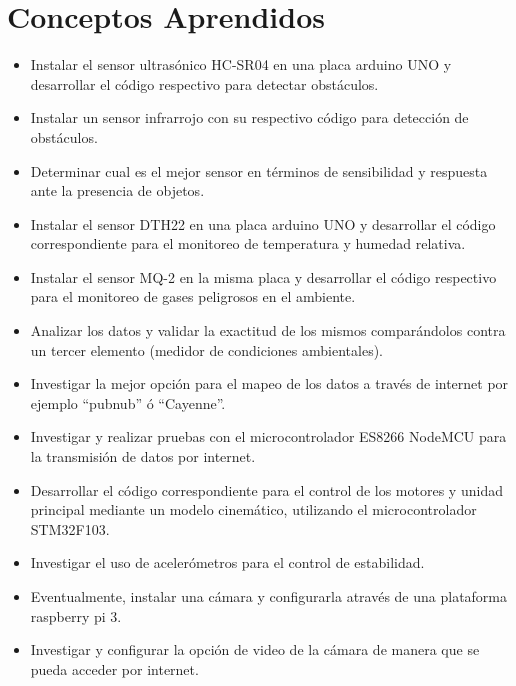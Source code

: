 \documentclass[12pt,letterpaper]{IEEEtran}
\begin{document}
\section{Conceptos Aprendidos}
\begin{itemize}
  \item Instalar el sensor ultrasónico HC-SR04 en una placa arduino UNO y desarrollar el código respectivo para detectar obstáculos.
  \item Instalar un sensor infrarrojo con su respectivo código para detección de obstáculos.
  \item  Determinar cual es el mejor sensor en términos de sensibilidad y respuesta ante la presencia de objetos.
  \item Instalar el sensor DTH22 en una placa arduino UNO y desarrollar el código correspondiente para el monitoreo de temperatura y humedad relativa.
  \item Instalar el sensor MQ-2 en la misma placa y desarrollar el código respectivo para el monitoreo de gases peligrosos en el ambiente.
  \item  Analizar los datos y validar la exactitud de los mismos comparándolos contra un tercer elemento (medidor de condiciones ambientales).
  \item Investigar la mejor opción para el mapeo de los datos a través de internet por ejemplo ``pubnub'' ó ``Cayenne''.
  \item Investigar y realizar pruebas con el microcontrolador ES8266 NodeMCU para la transmisión de datos por internet.
  \item Desarrollar el código correspondiente para el control de los motores y unidad principal mediante un modelo cinemático, utilizando el microcontrolador STM32F103.
  \item Investigar el uso de acelerómetros para el control de estabilidad. 
  \item Eventualmente, instalar una cámara y configurarla através de una plataforma raspberry pi 3.
  \item Investigar y configurar la opción de video de la cámara de manera que se pueda acceder por internet.
  
   
 
   
\end{itemize}
\end{document}
